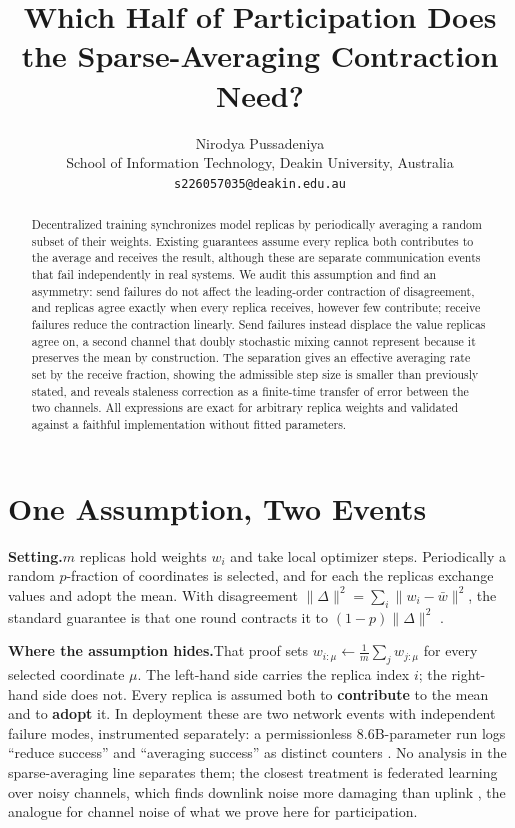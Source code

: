 \documentclass{article}
\title{Which Half of Participation Does the Sparse-Averaging Contraction Need?}
\author{%
  Nirodya Pussadeniya \\
  School of Information Technology, Deakin University, Australia \\
  \texttt{s226057035@deakin.edu.au}
}
\theoremstyle{plain}
\begin{document}
\maketitle

\begin{abstract}
Decentralized training synchronizes model replicas by periodically averaging a
random subset of their weights. Existing guarantees assume every replica both
contributes to the average and receives the result, although these are separate
communication events that fail independently in real systems. We audit this
assumption and find an asymmetry: send failures do not affect the leading-order
contraction of disagreement, and replicas agree exactly when every replica
receives, however few contribute; receive failures reduce the contraction
linearly. Send failures instead displace the value replicas agree on, a second
channel that doubly stochastic mixing cannot represent because it preserves the
mean by construction. The separation gives an effective averaging rate set by
the receive fraction, showing the admissible step size is smaller than
previously stated, and reveals staleness correction as a finite-time transfer of
error between the two channels. All expressions are exact for arbitrary replica
weights and validated against a faithful implementation without fitted
parameters.
\end{abstract}\vspace{-8pt}

\vspace{-17pt}\section{One Assumption, Two Events}\label{sec:audit}\vspace{-9pt}

\textbf{Setting.}\quad $m$ replicas hold weights $w_i$ and take local optimizer
steps. Periodically a random $p$-fraction of coordinates is selected, and for
each the replicas exchange values and adopt the mean. With disagreement
$\|\Delta\|^2=\sum_i\|w_i-\bar w\|^2$, the standard guarantee is that one round
contracts it to $(1-p)\|\Delta\|^2$
\citep{beton2025sparta,ajanthan2026asyncmesh}.

\textbf{Where the assumption hides.}\quad That proof sets
$w_{i:\mu} \leftarrow \frac{1}{m}\sum_j w_{j:\mu}$ for every selected coordinate
$\mu$. The left-hand side carries the replica index $i$; the right-hand side does
not. Every replica is assumed both to \textbf{contribute} to the mean and to
\textbf{adopt} it. In deployment these are two network events with independent
failure modes, instrumented separately: a permissionless 8.6B-parameter run logs
``reduce success'' and ``averaging success'' as distinct counters
\citep{avraham2026agora}. No analysis in the sparse-averaging line separates
them; the closest treatment is federated learning over noisy channels, which
finds downlink noise more damaging than uplink
\citep{wei2021noisy,upadhyay2023snr}, the analogue for channel noise of what we
prove here for participation.
\end{document}
